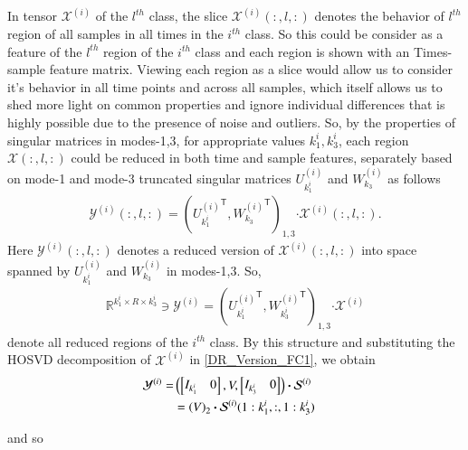 \documentclass[preprint,12pt]{elsarticle}
\newcommand{\trans}{\mathsf{T}}
\begin{document}
In tensor  $\mathcal{X}^{(i)}$ of the $l^{th}$ class, the slice $\mathcal{X}^{(i)}(:,l,:)$ denotes
the  behavior of $l^{th}$  region of all samples in all times in the $i^{th}$ class. So this could be consider as a feature of the $l^{th}$ region  of the $i^{th}$ class and each region is shown with an Times-sample feature matrix. Viewing each region as a slice would allow us to consider it's behavior in all time points and across all samples, which itself allows us to shed more light on common properties and ignore individual differences that is highly possible due to the presence of noise and outliers.
So, by the properties of singular matrices in modes-1,3, for appropriate values
$k_1^i,k_3^i$, each region $\mathcal{X}(:,l,:)$ could be reduced in both time and sample features, separately
based on mode-1 and mode-3 truncated singular matrices $U_{k_1^i}^{(i)}$ and $W_{k_3}^{(i)}$
as follows
\begin{eqnarray}
\mathcal{Y}^{(i)}(:,l,:) = \left( 
{U_{k_1^i}^{(i)}}^{\trans},  {W_{k_3}^{(i)}}^{\trans} 
\right)_{1,3} \boldsymbol{\cdot} \mathcal{X}^{(i)}(:,l,:).
\end{eqnarray}
Here $\mathcal{Y}^{(i)}(:,l,:)$  denotes a reduced version of $\mathcal{X}^{(i)}(:,l,:)$ into space
spanned by $U_{k_1^i}^{(i)}$ and $W_{k_3}^{(i)}$ in modes-1,3. So,
\begin{align}
\mathbb{R}^{k_1^i \times R \times k_3^i} \ni  {{\mathcal{Y}^{(i)}}} = \left( 
{U_{k_1^i}^{(i)}}^{\trans}, {W_{k^i_3}^{(i)}}^{\trans} 
\right)_{1,3}\boldsymbol{\cdot} \mathcal{X}^{(i)} \label{DR_Version_FC1}
\end{align} 
denote all reduced regions of the $i^{th}$ class. By this structure  and substituting the HOSVD decomposition of $\mathcal{X}^{(i)}$ in \eqref{DR_Version_FC1},  we obtain
\begin{align}
{\mathcal{Y}}^{(i)}= & \notag
\left(
\begin{bmatrix}
I_{k_1^i} &  0
\end{bmatrix},
V,
\begin{bmatrix}
I_{k_3^i} &  0
\end{bmatrix}
\right)\boldsymbol{\cdot} \mathcal{S}^{(i)} \notag
\\&=\left( 
V
\right)_{2} \boldsymbol{\cdot} \mathcal{S}^{(i)}(1:k_1^i,:, 1:k_3^i) \notag &
\end{align}

and so
\end{document}
